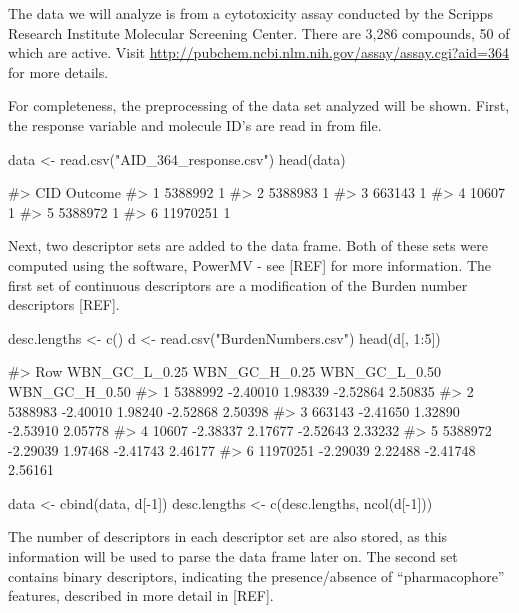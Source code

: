The data we will analyze is from a cytotoxicity assay conducted by the
Scripps Research Institute Molecular Screening Center. There are 3,286
compounds, 50 of which are active. Visit
\url{http://pubchem.ncbi.nlm.nih.gov/assay/assay.cgi?aid=364} for more
details.

For completeness, the preprocessing of the data set analyzed will be
shown. First, the response variable and molecule ID's are read in from
file.

\begin{Schunk}
\begin{Sinput}
data <- read.csv("AID_364_response.csv")
head(data)
\end{Sinput}
\begin{Soutput}
#>        CID Outcome
#> 1  5388992       1
#> 2  5388983       1
#> 3   663143       1
#> 4    10607       1
#> 5  5388972       1
#> 6 11970251       1
\end{Soutput}
\end{Schunk}

Next, two descriptor sets are added to the data frame. Both of these
sets were computed using the software, PowerMV - see {[}REF{]} for more
information. The first set of continuous descriptors are a modification
of the Burden number descriptors {[}REF{]}.

\begin{Schunk}
\begin{Sinput}
desc.lengths <- c()
d <- read.csv("BurdenNumbers.csv")
head(d[, 1:5])
\end{Sinput}
\begin{Soutput}
#>        Row WBN_GC_L_0.25 WBN_GC_H_0.25 WBN_GC_L_0.50 WBN_GC_H_0.50
#> 1  5388992      -2.40010       1.98339      -2.52864       2.50835
#> 2  5388983      -2.40010       1.98240      -2.52868       2.50398
#> 3   663143      -2.41650       1.32890      -2.53910       2.05778
#> 4    10607      -2.38337       2.17677      -2.52643       2.33232
#> 5  5388972      -2.29039       1.97468      -2.41743       2.46177
#> 6 11970251      -2.29039       2.22488      -2.41748       2.56161
\end{Soutput}
\begin{Sinput}
data <- cbind(data, d[-1])
desc.lengths <- c(desc.lengths, ncol(d[-1]))
\end{Sinput}
\end{Schunk}

The number of descriptors in each descriptor set are also stored, as
this information will be used to parse the data frame later on. The
second set contains binary descriptors, indicating the presence/absence
of ``pharmacophore'' features, described in more detail in {[}REF{]}.

